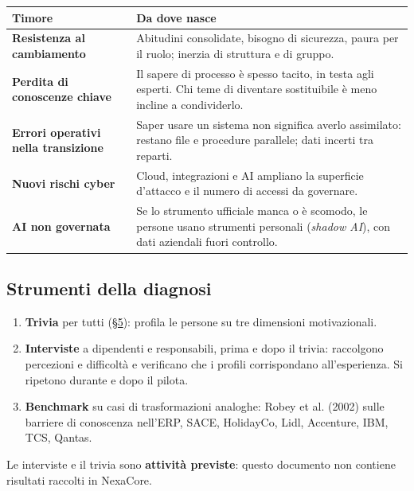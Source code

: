 \documentclass[11pt,a4paper]{article}
\begin{document}
{\small\renewcommand{\arraystretch}{1.25}
\begin{xltabular}{\linewidth}{@{}>{\raggedright\arraybackslash{}\hsize\hspace{0pt}}X>{\raggedright\arraybackslash{}\hsize\hspace{0pt}}X@{}}
\toprule
\textbf{Timore} & \textbf{Da dove nasce} \\
\midrule
\endhead
\textbf{Resistenza al cambiamento} & Abitudini consolidate, bisogno di sicurezza, paura per il ruolo; inerzia di struttura e di gruppo. \\
\textbf{Perdita di conoscenze chiave} & Il sapere di processo è spesso tacito, in testa agli esperti. Chi teme di diventare sostituibile è meno incline a condividerlo. \\
\textbf{Errori operativi nella transizione} & Saper usare un sistema non significa averlo assimilato: restano file e procedure parallele; dati incerti tra reparti. \\
\textbf{Nuovi rischi cyber} & Cloud, integrazioni e AI ampliano la superficie d'attacco e il numero di accessi da governare. \\
\textbf{AI non governata} & Se lo strumento ufficiale manca o è scomodo, le persone usano strumenti personali (\emph{shadow AI}), con dati aziendali fuori controllo. \\
\bottomrule
\end{xltabular}}

\subsection{Strumenti della diagnosi}\label{sec:4.4}
\begin{enumerate}
\item \textbf{Trivia} per tutti (\hyperref[sec:5]{\S5}): profila le persone su tre dimensioni motivazionali.
\item \textbf{Interviste} a dipendenti e responsabili, prima e dopo il trivia: raccolgono percezioni e difficoltà e verificano che i profili corrispondano all'esperienza. Si ripetono durante e dopo il pilota.
\item \textbf{Benchmark} su casi di trasformazioni analoghe: Robey et al. (2002) sulle barriere di conoscenza nell'ERP, SACE, HolidayCo, Lidl, Accenture, IBM, TCS, Qantas.
\end{enumerate}

Le interviste e il trivia sono \textbf{attività previste}: questo documento non contiene risultati raccolti in NexaCore.
\end{document}
